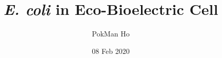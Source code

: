 \documentclass[a4paper,11pt]{article}
\title{\textit{E. coli} in Eco-Bioelectric Cell}
\author{PokMan Ho}
\date{08 Feb 2020}
\begin{document}
    \maketitle
    \tableofcontents
    
    \nocite{*}\printbibliography
\end{document}
